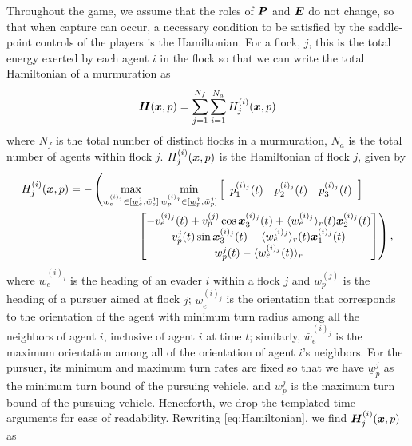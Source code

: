 Throughout the game, we assume that the roles of $\bm{P}$  and $\bm{E}$ do not change, so that when capture can occur, a necessary condition to be satisfied by the saddle-point controls of the players is the Hamiltonian. For  a flock, $j$, this is the total energy exerted by each agent $i$ in the flock so that we can write the total Hamiltonian of a murmuration as 
%
\begin{align}
\bm{H}(\bm{x}, p) = \sum_{j=1}^{N_f} \sum_{i=1}^{N_a} H^{(i)}_j(\bm{x}, p)
\label{eq:HamiltonianOverall}
\end{align}
%
where $N_f$ is the total number of distinct flocks in a murmuration, $N_a$ is the total number of agents within flock $j$. $H^{(i)}_j(\bm{x}, p)$ is the Hamiltonian of flock $j$,  given by
%
\begin{align}
H^{(i)}_j(\state, p)&= - \left(\max_{w_e^{(i)_j} \in [\underline{w}_e^j, \bar{w}_e^j]}  \min_{w_p^{(i)_j}  \in [\underline{w}_p^{j}, \bar{w}_p^j]}  \left[\begin{array}{ccc} p_1^{(i)_j}(t) & p_2^{(i)_j}(t) & p_3^{(i)_j}(t) \end{array}\right] \right. \nonumber \\ 
%
& \qquad\qquad\qquad \left. 
\begin{bmatrix}
-v_e^{(i)_j}(t) + v_p^{(j)} \cos \state_3^{(i)_j}(t) + \langle w_e^{(i)_j} \rangle_r (t) \state_2^{(i)_j}(t)
\\ 
v_p^{j}(t)\sin \state_3^{(i)_j}(t) -\langle w_e^{(i)_j} \rangle_r (t) \state_1^{(i)_j}(t)
\\ 
w_p^j(t) - \langle w_e^{(i)_j}(t) \rangle_r
\end{bmatrix}\right),
\label{eq:Hamiltonian}
\end{align}
%
where $w_e^{(i)_j}$ is the heading of an evader $i$ within a flock $j$ and $w_p^{(j)}$ is the heading of a pursuer aimed at flock $j$; $\underline{w}_e^{(i)_j}$ is the orientation that corresponds to  the orientation of the agent with minimum turn radius among all the neighbors of agent $i$, inclusive of agent $i$ at time $t$; similarly, $\bar{w}_e^{(i)_j}$ is  the maximum orientation among all of the orientation of agent $i$'s neighbors. For the pursuer, its minimum and maximum turn rates are fixed so that we have $\underline{w}_p^{j}$ as the minimum turn bound of the pursuing vehicle, and $\bar{w}_p^j$ is the maximum turn bound of the pursuing vehicle. Henceforth, we drop the templated time arguments for ease of readability. Rewriting \eqref{eq:Hamiltonian}, we find $\bm{H}^{(i)}_j(\bm{x}, p)$ as
%
